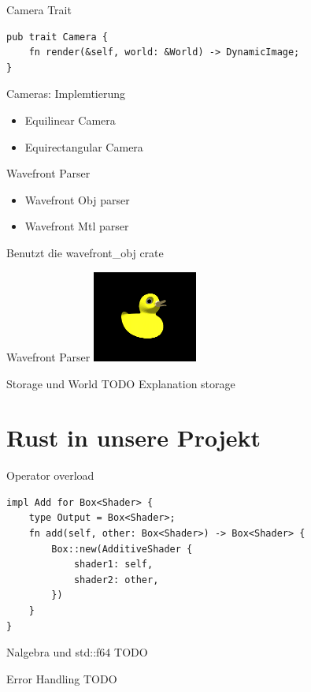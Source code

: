 \documentclass[aspectratio=169]{beamer}
\begin{document}
\begin{frame}[fragile]{Camera Trait}
    \begin{lstlisting}
pub trait Camera {
    fn render(&self, world: &World) -> DynamicImage;
}
    \end{lstlisting}
\end{frame}
\begin{frame}{Cameras: Implemtierung}
    \begin{itemize}[<+->]
        \item Equilinear Camera
        \item Equirectangular Camera
    \end{itemize}
\end{frame}
\begin{frame}{Wavefront Parser}
    \begin{itemize}[<+->]
        \item Wavefront Obj parser
        \item Wavefront Mtl parser
    \end{itemize}
    Benutzt die wavefront\_obj crate
\end{frame}
\begin{frame}{Wavefront Parser}
    \includegraphics[height=3cm]{example-duck}
\end{frame}
\begin{frame}{Storage und World}
    TODO Explanation storage
\end{frame}
\section{Rust in unsere Projekt}
\begin{frame}[fragile]{Operator overload}
    \begin{lstlisting}
impl Add for Box<Shader> {
    type Output = Box<Shader>;
    fn add(self, other: Box<Shader>) -> Box<Shader> {
        Box::new(AdditiveShader {
            shader1: self,
            shader2: other,
        })
    }
}
    \end{lstlisting}
\end{frame}
\begin{frame}{Nalgebra und std::f64}
    TODO
\end{frame}
\begin{frame}{Error Handling}
    TODO
\end{frame}
\end{document}
